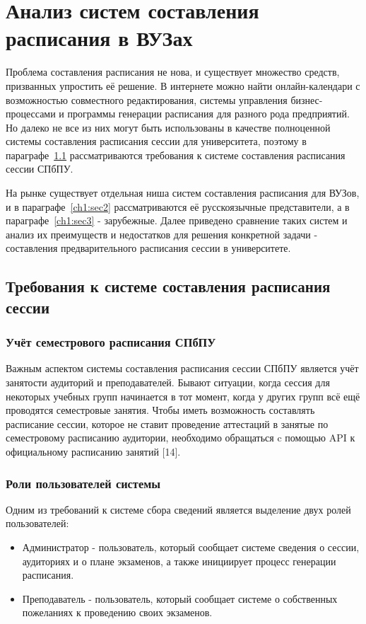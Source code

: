 \chapter{Анализ систем составления расписания в ВУЗах} \label{ch1}

Проблема составления расписания не нова, и существует множество средств, призванных упростить её решение. В интернете можно найти онлайн-календари с возможностью совместного редактирования, системы управления бизнес-процессами и программы генерации расписания для разного рода предприятий. Но далеко не все из них могут быть использованы в качестве полноценной системы составления расписания сессии для университета, поэтому в параграфе~\ref{ch1:sec1} рассматриваются требования к системе составления расписания сессии СПбПУ.

На рынке существует отдельная ниша систем составления расписания для ВУЗов, и в параграфе~\ref{ch1:sec2} рассматриваются её русскоязычные представители, а в параграфе~\ref{ch1:sec3} - зарубежные. Далее приведено сравнение таких систем и анализ их преимуществ и недостатков для решения конкретной задачи - составления предварительного расписания сессии в университете.

\section{Требования к системе составления расписания сессии} \label{ch1:sec1}

\subsection{Учёт семестрового расписания СПбПУ}

Важным аспектом системы составления расписания сессии СПбПУ является учёт занятости аудиторий и преподавателей. Бывают ситуации, когда сессия для некоторых учебных групп начинается в тот момент, когда у других групп всё ещё проводятся семестровые занятия. Чтобы иметь возможность составлять расписание сессии, которое не ставит проведение аттестаций в занятые по семестровому расписанию аудитории, необходимо обращаться c помощью API к официальному расписанию занятий [14]. 

\subsection{Роли пользователей системы}
Одним из требований к системе сбора сведений является выделение двух ролей пользователей:
\begin{itemize}
	\item Администратор - пользователь, который сообщает системе сведения о сессии, аудиториях и о плане экзаменов, а также инициирует процесс генерации расписания.
	\item Преподаватель - пользователь, который сообщает системе о собственных пожеланиях к проведению своих экзаменов.
\end{itemize}

